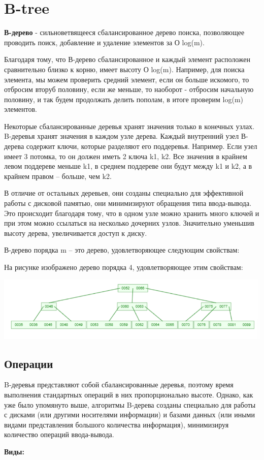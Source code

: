 \section{B-tree}
        \textbf{В-дерево} - сильноветвящееся сбалансированное дерево поиска, позволяющее проводить поиск, добавление и удаление элементов за О log(m).
        \par
        Благодаря тому, что В-дерево сбалансированное и каждый элемент расположен сравнительно близко к корню, имеет высоту О log(m). Например, для поиска элемента, мы можем проверить средний элемент, если он больше искомого, то отбросим вторуб половину, если же меньше, то наоборот - отбросим начальную половину, и так будем продолжать делить пополам, в итоге проверим log(m) элементов.
        \par
         Некоторые сбалансированные деревья хранят значения только в конечных узлах. B-деревья хранят значения в каждом узле дерева. Каждый внутренний узел В-дерева содержит ключи, которые разделяют его поддеревья. Например. Если узел имеет 3 потомка, то он должен иметь 2 ключа k1, k2. Все значения в крайнем левом поддереве меньше k1, в среднем поддереве они будут между k1 и k2, а в крайнем правом – больше, чем k2.
         \par
         В отличие от остальных деревьев, они созданы специально для эффективной работы с дисковой памятью, они минимизируют обращения типа ввода-вывода. Это происходит благодаря тому, что в одном узле можно хранить много ключей и при этом можно ссылаться на несколько дочерних узлов. Значительно уменьшив высоту дерева, увеличивается доступ к диску. 
         \par
        В-дерево порядка m – это дерево, удовлетворяющее следующим свойствам:
        
        
        На рисунке изображено дерево порядка 4, удовлетворяющее этим свойствам:\par
        \includegraphics[width=1\linewidth]{tree_ex.png} \par
        \newpage
        \subsection{Операции}
        B-деревья представляют собой сбалансированные деревья, поэтому время выполнения стандартных операций в них пропорционально высоте. Однако, как уже было упомянуто выше, алгоритмы B-дерева созданы специально для работы с дисками (или другими носителями информации) и базами данных (или иными видами представления большого количества информация), минимизируя количество операций ввода-вывода. \par
        \textbf{Виды:} \par
        
